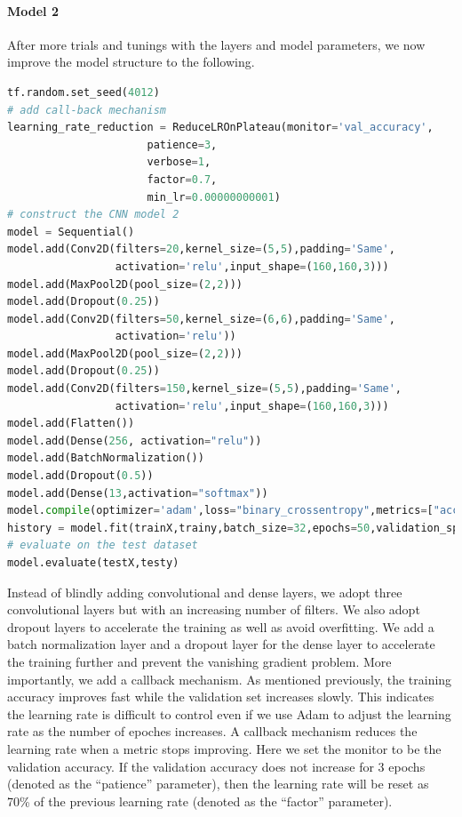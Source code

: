\paragraph{Model 2}
After more trials and tunings with the layers and model parameters, we now improve the model structure to the following.

\begin{lstlisting}[language=python]
tf.random.set_seed(4012)
# add call-back mechanism
learning_rate_reduction = ReduceLROnPlateau(monitor='val_accuracy', 
                      patience=3, 
                      verbose=1, 
                      factor=0.7, 
                      min_lr=0.00000000001)
# construct the CNN model 2
model = Sequential()
model.add(Conv2D(filters=20,kernel_size=(5,5),padding='Same', 
                 activation='relu',input_shape=(160,160,3)))
model.add(MaxPool2D(pool_size=(2,2)))
model.add(Dropout(0.25))
model.add(Conv2D(filters=50,kernel_size=(6,6),padding='Same', 
                 activation='relu'))
model.add(MaxPool2D(pool_size=(2,2)))
model.add(Dropout(0.25))
model.add(Conv2D(filters=150,kernel_size=(5,5),padding='Same', 
                 activation='relu',input_shape=(160,160,3)))
model.add(Flatten())
model.add(Dense(256, activation="relu"))
model.add(BatchNormalization())
model.add(Dropout(0.5))
model.add(Dense(13,activation="softmax"))
model.compile(optimizer='adam',loss="binary_crossentropy",metrics=["accuracy"])
history = model.fit(trainX,trainy,batch_size=32,epochs=50,validation_split=0.2, callbacks=[learning_rate_reduction])
# evaluate on the test dataset
model.evaluate(testX,testy)
\end{lstlisting}
\vspace{-0.6cm}
Instead of blindly adding convolutional and dense layers, we adopt three convolutional layers but with an increasing number of filters. We also adopt dropout layers to accelerate the training as well as avoid overfitting. We add a batch normalization layer and a dropout layer for the dense layer to accelerate the training further and prevent the vanishing gradient problem. More importantly, we add a callback mechanism. As mentioned previously, the training accuracy improves fast while the validation set increases slowly. This indicates the learning rate is difficult to control even if we use Adam to adjust the learning rate as the number of epoches increases. A callback mechanism reduces the learning rate when a metric stops improving. Here we set the monitor to be the validation accuracy. If the validation accuracy does not increase for 3 epochs (denoted as the ``patience'' parameter), then the learning rate will be reset as 70\% of the previous learning rate (denoted as the ``factor'' parameter). 

